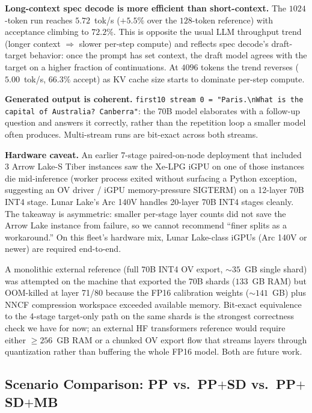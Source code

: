 \documentclass[11pt]{article}
\begin{document}
\textbf{Long-context spec decode is more efficient than short-context.} The $1024$-token run reaches $5.72$~tok/s ($+5.5\%$ over the $128$-token reference) with acceptance climbing to $72.2\%$. This is opposite the usual LLM throughput trend (longer context $\Rightarrow$ slower per-step compute) and reflects spec decode's draft-target behavior: once the prompt has set context, the draft model agrees with the target on a higher fraction of continuations. At $4096$ tokens the trend reverses ($5.00$~tok/s, $66.3\%$ accept) as KV cache size starts to dominate per-step compute.

\textbf{Generated output is coherent.} \texttt{first10 stream 0 = "Paris.\textbackslash nWhat is the capital of Australia? Canberra"}: the 70B model elaborates with a follow-up question and answers it correctly, rather than the repetition loop a smaller model often produces. Multi-stream runs are bit-exact across both streams.

\textbf{Hardware caveat.} An earlier 7-stage paired-on-node deployment that included 3 Arrow Lake-S Tiber instances saw the Xe-LPG iGPU on one of those instances die mid-inference (worker process exited without surfacing a Python exception, suggesting an OV driver / iGPU memory-pressure SIGTERM) on a 12-layer 70B INT4 stage. Lunar Lake's Arc 140V handles 20-layer 70B INT4 stages cleanly. The takeaway is asymmetric: smaller per-stage layer counts did not save the Arrow Lake instance from failure, so we cannot recommend ``finer splits as a workaround.'' On this fleet's hardware mix, Lunar Lake-class iGPUs (Arc 140V or newer) are required end-to-end.

A monolithic external reference (full 70B INT4 OV export, $\sim 35$~GB single shard) was attempted on the machine that exported the 70B shards ($133$~GB RAM) but OOM-killed at layer 71/80 because the FP16 calibration weights ($\sim 141$~GB) plus NNCF compression workspace exceeded available memory. Bit-exact equivalence to the 4-stage target-only path on the same shards is the strongest correctness check we have for now; an external HF transformers reference would require either $\geq 256$~GB RAM or a chunked OV export flow that streams layers through quantization rather than buffering the whole FP16 model. Both are future work.

\subsection{Scenario Comparison: PP vs.\ PP$+$SD vs.\ PP$+$SD$+$MB}
\label{sec:scenario_compare}
\end{document}

